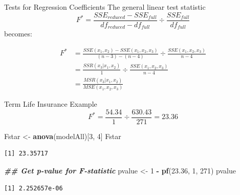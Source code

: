 \documentclass[
  ignorenonframetext,
]{beamer}
\newenvironment{Shaded}{\begin{snugshade}}{\end{snugshade}}
\newcommand{\DecValTok}[1]{\textcolor[rgb]{0.00,0.00,0.81}{#1}}
\newcommand{\DocumentationTok}[1]{\textcolor[rgb]{0.56,0.35,0.01}{\textbf{\textit{#1}}}}
\newcommand{\FloatTok}[1]{\textcolor[rgb]{0.00,0.00,0.81}{#1}}
\newcommand{\FunctionTok}[1]{\textcolor[rgb]{0.13,0.29,0.53}{\textbf{#1}}}
\newcommand{\NormalTok}[1]{#1}
\newcommand{\OtherTok}[1]{\textcolor[rgb]{0.56,0.35,0.01}{#1}}
\newcommand{\SpecialCharTok}[1]{\textcolor[rgb]{0.81,0.36,0.00}{\textbf{#1}}}
\begin{document}
\begin{frame}{Tests for Regression Coefficients}
\label{tests-for-regression-coefficients-2}
The general linear test statistic
\[F^*=\frac{SSE_{reduced}-SSE_{full}}{df_{reduced}-df_{full}}\div \frac{SSE_{full}}{df_{full}}\]
becomes:

\[  \begin{array}{ll}
F^* &= \frac{SSE(x_1,x_2)-SSE(x_1,x_2,x_3)}{(n-3)-(n-4)}\div \frac{SSE(x_1,x_2,x_3)}{n-4}\\ 
&=\frac{SSR(x_3|x_1,x_2)}{1}\div \frac{SSE(x_1,x_2,x_3)}{n-4} \\
&=\frac{MSR(x_3|x_1,x_2)}{MSE(x_1,x_2,x_3)}
\end{array}\]
\end{frame}

\begin{frame}[fragile]{Term Life Insurance Example}
\label{term-life-insurance-example-2}
\[F^*=\frac{54.34}{1}\div \frac{630.43}{271}=23.36\] \normalsize

\begin{Shaded}
\begin{Highlighting}[]
\NormalTok{Fstar }\OtherTok{\textless{}{-}} \FunctionTok{anova}\NormalTok{(modelAll)[}\DecValTok{3}\NormalTok{, }\DecValTok{4}\NormalTok{]}
\NormalTok{Fstar}
\end{Highlighting}
\end{Shaded}

\begin{verbatim}
[1] 23.35717
\end{verbatim}

\begin{Shaded}
\begin{Highlighting}[]
\DocumentationTok{\#\# Get p{-}value for F{-}statistic}
\NormalTok{pvalue }\OtherTok{\textless{}{-}} \DecValTok{1} \SpecialCharTok{{-}} \FunctionTok{pf}\NormalTok{(}\FloatTok{23.36}\NormalTok{, }\DecValTok{1}\NormalTok{, }\DecValTok{271}\NormalTok{)}
\NormalTok{pvalue}
\end{Highlighting}
\end{Shaded}

\begin{verbatim}
[1] 2.252657e-06
\end{verbatim}

\normalsize
\end{frame}
\end{document}
